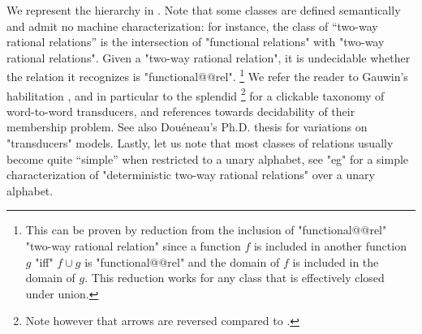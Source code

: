 We represent the hierarchy in .
Note that some classes are defined semantically and admit no machine characterization:
for instance, the class of ``two-way rational relations'' is the intersection
of "functional relations" with  "two-way rational relations".
Given a "two-way rational relation", it is undecidable whether the relation it
recognizes is "functional@@rel".%
\footnote{This can be proven by reduction from the inclusion of "functional@@rel" "two-way rational relation" since a function $f$ is included in another function $g$
"iff" $f\cup g$ is "functional@@rel" and the domain of $f$ is included in the domain of $g$. This reduction works for any class that
is effectively closed under union.}
We refer the reader to
Gauwin's habilitation \cite{Gauwin2020Transductions}, and in particular
to the splendid \cite[Figure~2.1, p.~16]{Gauwin2020Transductions}%
\footnote{Note however that arrows are reversed compared to
.}
for a clickable taxonomy of word-to-word transducers, and references towards
decidability of their membership problem.
See also Douéneau's Ph.D. thesis \cite[\S~1]{Douéneau2023PhD} for variations on
"transducers" models.
Lastly, let us note that most classes of relations usually become quite ``simple'' when restricted 
to a unary alphabet, see "eg" \cite[Theorem~1]{ChoffrutGuillon2014UnaryTransducers} for a simple
characterization of "deterministic two-way rational relations" over a unary alphabet.